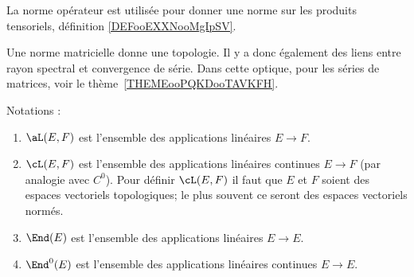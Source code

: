 La norme opérateur est utilisée pour donner une norme sur les produits tensoriels, définition \ref{DEFooEXXNooMgIpSV}.

Une norme matricielle donne une topologie. Il y a donc également des liens entre rayon spectral et convergence de série. Dans cette optique, pour les séries de matrices, voir le thème~\ref{THEMEooPQKDooTAVKFH}.

Notations :
\begin{enumerate}
	\item
	      \( \aL(E,F)\) est l'ensemble des applications linéaires \( E\to F\).
	\item
	      \( \cL(E,F)\) est l'ensemble des applications linéaires continues \( E\to F\) (par analogie avec \( C^0\)). Pour définir \( \cL(E,F)\) il faut que \( E\) et \( F\) soient des espaces vectoriels topologiques; le plus souvent ce seront des espaces vectoriels normés.
	\item
	      \( \End(E)\) est l'ensemble des applications linéaires \( E\to E\).
	\item
	      \( \End^0(E)\) est l'ensemble des applications linéaires continues \( E\to E\).
\end{enumerate}
